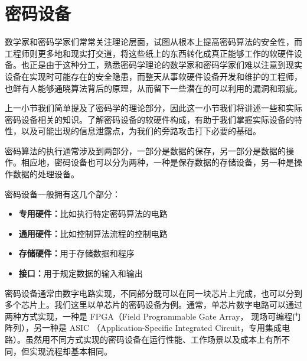 


\section{密码设备} %
数学家和密码学家们常常关注理论层面，试图从根本上提高密码算法的安全性，而工程师则更多地和现实打交道，将这些纸上的东西转化成真正能够工作的软硬件设备。也正是由于这种分工，熟悉密码学理论的数学家和密码学家们难以注意到现实设备在实现时可能存在的安全隐患，而整天从事软硬件设备开发和维护的工程师，也鲜有人能够通晓算法背后的原理，从而留下一些潜在的可以利用的漏洞和瑕疵。

上一小节我们简单提及了密码学的理论部分，因此这一小节我们将讲述一些和实际密码设备相关的知识。了解密码设备的软硬件构成，有助于我们掌握实际设备的特性，以及可能出现的信息泄露点，为我们的旁路攻击打下必要的基础。

密码算法的执行通常涉及到两部分，一部分是数据的保存，另一部分是数据的操作。相应地，密码设备也可以分为两种，一种是保存数据的存储设备，另一种是操作数据的处理设备。

\vspace*{\baselineskip}

密码设备一般拥有这几个部分：

\begin{itemize}
\item \textbf{专用硬件：}比如执行特定密码算法的电路
\item \textbf{通用硬件：}比如控制算法流程的控制电路
\item \textbf{存储硬件：}用于存储数据和程序
\item \textbf{接口：}用于规定数据的输入和输出
\end{itemize}

\vspace*{\baselineskip}

密码设备通常由数字电路实现，不同部分既可以在同一块芯片上完成，也可以分到多个芯片上。我们这里以单芯片的密码设备为例。通常，单芯片数字电路可以通过两种方式实现，一种是 FPGA（Field Programmable Gate Array， 现场可编程门阵列），另一种是 ASIC （Application-Specific Integrated Circuit，专用集成电路）。虽然用不同方式实现的密码设备在运行性能、工作场景以及成本上有所不同，但实现流程却基本相同。

